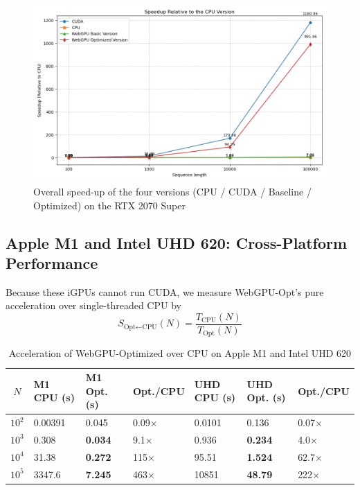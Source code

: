 \documentclass[PhD]{PHlab-thesis}
\begin{document}
\begin{figure}[htbp]
    \centering
    \includegraphics[width=0.7\linewidth]{2070s-4.png}
    \caption{Overall speed-up of the four versions (CPU / CUDA / Baseline / Optimized) on the RTX 2070 Super}
    \label{fig:2070s-overall-4versions}
\end{figure}


\subsection{Apple M1 and Intel UHD 620: Cross-Platform Performance}
Because these iGPUs cannot run CUDA, we measure WebGPU-Opt’s pure acceleration over single-threaded CPU by
\[
S_{\text{Opt} \leftarrow \text{CPU}}(N) = \frac{T_{\text{CPU}}(N)}{T_{\text{Opt}}(N)}
\]

\begin{table}[h]
    \centering
    \begin{tabularx}{\textwidth}{|c|X|X|X|X|X|X|}
        \hline
        $N$ & M1 CPU (s) & \textbf{M1 Opt. (s)} & Opt./CPU & UHD CPU (s) & \textbf{UHD Opt. (s)} & Opt./CPU \\
        \hline
        $10^2$ & 0.00391 & 0.045 & 0.09$\times$ & 0.0101 & 0.136 & 0.07$\times$ \\
        $10^3$ & 0.308 & \textbf{0.034} & 9.1$\times$ & 0.936 & \textbf{0.234} & 4.0$\times$ \\
        $10^4$ & 31.38 & \textbf{0.272} & 115$\times$ & 95.51 & \textbf{1.524} & 62.7$\times$ \\
        $10^5$ & 3347.6 & \textbf{7.245} & 463$\times$ & 10851 & \textbf{48.79} & 222$\times$ \\
        \hline
    \end{tabularx}
    \caption{Acceleration of WebGPU-Optimized over CPU on Apple M1 and Intel UHD 620}
    \label{tab:cross_platform}
\end{table}
\end{document}
